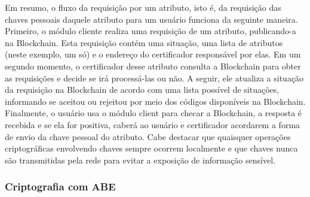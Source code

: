 \documentclass[a4paper,11pt]{article}
\begin{document}


Em resumo, o fluxo da requisição por um atributo, isto é, da requisição das chaves pessoais daquele atributo para um usuário funciona da seguinte maneira.
Primeiro, o módulo cliente realiza uma requisição de um atributo, publicando-a na Blockchain.
Esta requisição contém uma situação, uma lista de atributos (neste exemplo, um só) e o endereço do certificador responsável por elas.
Em um segundo momento, o certificador desse atributo consulta a Blockchain para obter as requisições e decide se irá processá-las ou não.
A seguir, ele atualiza a situação da requisição na Blockchain de acordo com uma lista possível de situações, informando se aceitou ou rejeitou por meio dos códigos disponíveis na Blockchain.
Finalmente, o usuário usa o módulo client para checar a Blockchain, a resposta é recebida e se ela for positiva, caberá ao usuário e certificador acordarem a forma de envio da chave pessoal do atributo.
Cabe destacar que quaisquer operações criptográficas envolvendo chaves sempre ocorrem localmente e que chaves nunca são transmitidas pela rede para evitar a exposição de informação sensível.

\subsubsection{Criptografia com ABE}
\label{sec:sub:criptografia-abe}
\end{document}

